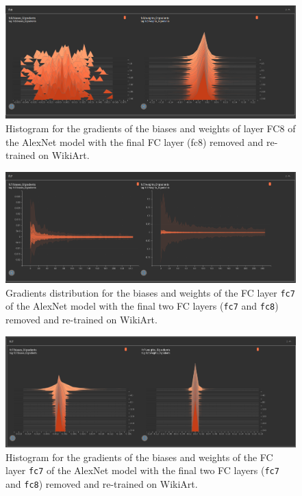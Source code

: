 \documentclass{article}
\def\code#1{\texttt{#1}}
\begin{document}
\begin{figure}[h]
	\centering
	\includegraphics[width=0.85\linewidth]{images/histogram_fc8.png}
	\caption{Histogram for the gradients of the biases and weights of layer FC8 of the AlexNet model with the final FC layer (fc8) removed and re-trained on WikiArt.}
\end{figure}

\begin{figure}[h]
	\centering
	\includegraphics[width=\linewidth]{images/distributions_fc7_2.png}
	\caption{Gradients distribution for the biases and weights of the FC layer \code{fc7} of the AlexNet model with the final two FC layers (\code{fc7} and \code{fc8}) removed and re-trained on WikiArt.}
\end{figure}

\begin{figure}[h]
	\includegraphics[width=\linewidth]{images/histogram_fc7_2.png} 
	\caption{Histogram for the gradients of the biases and weights of the FC layer \code{fc7} of the AlexNet model with the final two FC layers (\code{fc7} and \code{fc8}) removed and re-trained on WikiArt.}
\end{figure}
\end{document}
